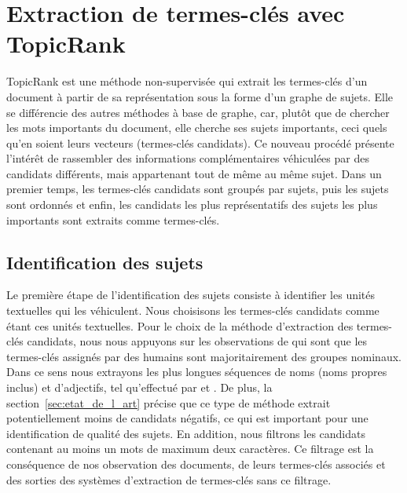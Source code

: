 \section{Extraction de termes-clés avec TopicRank}
\label{sec:extraction_de_termes_cles_avec_topicrank}
  TopicRank est une méthode non-supervisée qui extrait les termes-clés d'un
  document à partir de sa représentation sous la forme d'un graphe de sujets.
  Elle se différencie des autres méthodes à base de graphe, car, plutôt que de
  chercher les mots importants du document, elle cherche ses sujets importants,
  ceci quels qu'en soient leurs vecteurs (termes-clés candidats). Ce nouveau
  procédé présente l'intérêt de rassembler des informations complémentaires
  véhiculées par des candidats différents, mais appartenant tout de même au même
  sujet.
  Dans un premier temps, les termes-clés candidats sont groupés par sujets, puis
  les sujets sont ordonnés et enfin, les candidats les plus représentatifs des
  sujets les plus importants sont extraits comme termes-clés.

  \subsection{Identification des sujets}
  \label{subsec:identification_des_sujets}
    Le première étape de l'identification des sujets consiste à identifier les
    unités textuelles qui les véhiculent. Nous choisisons les termes-clés
    candidats comme étant ces unités textuelles.
    Pour le choix de la méthode d'extraction des termes-clés candidats, nous
    nous appuyons sur les observations de 
    qui sont que les termes-clés assignés par des humains sont majoritairement
    des groupes nominaux. Dans ce sens nous extrayons les plus longues séquences
    de noms (noms propres inclus) et d'adjectifs, tel qu'effectué par
     et . De plus, la
    section~\ref{sec:etat_de_l_art} précise que ce type de méthode extrait
    potentiellement moins de candidats négatifs, ce qui est important pour une
    identification de qualité des sujets. En addition, nous filtrons les
    candidats contenant au moins un mots de maximum deux caractères. Ce filtrage
    est la conséquence de nos observation des documents, de leurs termes-clés
    associés et des sorties des systèmes d'extraction de termes-clés sans ce
    filtrage.


